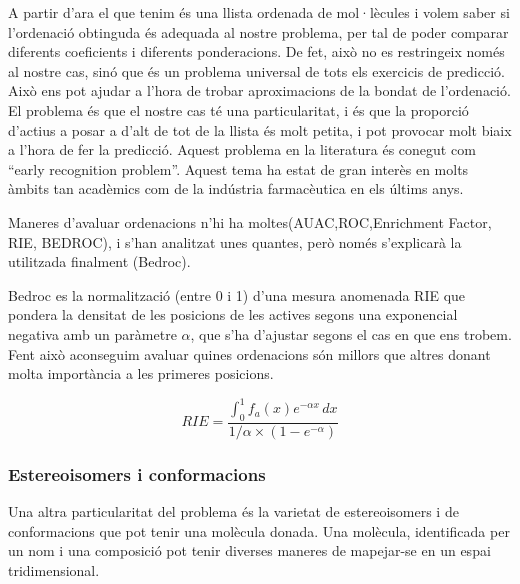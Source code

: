 
A partir d'ara el que tenim és una llista ordenada de mol·lècules i volem saber
si l'ordenació obtinguda és adequada al nostre problema, per tal de poder
comparar diferents coeficients i diferents ponderacions. De fet, això no es
restringeix només al nostre cas, sinó que és un problema universal de tots els
exercicis de predicció. Això ens pot ajudar a l'hora de trobar aproximacions de
la bondat de l'ordenació. El problema és que el nostre cas té una
particularitat, i és que la proporció d'actius a posar a d'alt de tot de la
llista és molt petita, i pot provocar molt biaix a l'hora de fer la predicció.
Aquest problema en la literatura és conegut com ``early recognition
problem''. Aquest tema ha estat de gran interès en molts àmbits tan acadèmics
com de la indústria farmacèutica en els últims anys.

Maneres d'avaluar ordenacions n'hi ha moltes(AUAC,ROC,Enrichment
Factor, RIE, BEDROC), i s'han analitzat unes quantes, però només
s'explicarà la utilitzada finalment (Bedroc).

Bedroc es la normalització (entre 0 i 1) d'una mesura anomenada RIE que pondera
la densitat de les posicions de les actives segons una exponencial negativa amb
un paràmetre $\alpha$, que s'ha d'ajustar segons el cas en que ens trobem.  Fent
això aconseguim avaluar quines ordenacions són millors que altres donant molta
importància a les primeres posicions.

$$ RIE =\frac{\int_{0}^{1} f_{a}(x)e^{-\alpha x}\, dx} { 1/\alpha \times (1-e^{-\alpha})}  $$


\subsubsection{Estereoisomers i conformacions}
\label{ssub:estereoisomers i conformacions}

Una altra particularitat del problema és la varietat de estereoisomers i de
conformacions que pot tenir una molècula donada.  Una molècula, identificada per
un nom i una composició pot tenir diverses maneres de mapejar-se en un espai
tridimensional.

